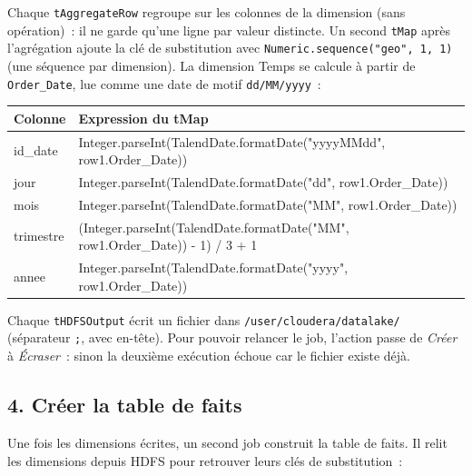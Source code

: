 \noindent Chaque \texttt{tAggregateRow} regroupe sur les colonnes de la dimension (sans opération)~: il ne garde qu'une ligne par valeur distincte. Un second \texttt{tMap} après l'agrégation ajoute la clé de substitution avec \texttt{Numeric.sequence("geo", 1, 1)} (une séquence par dimension). La dimension Temps se calcule à partir de \texttt{Order\_Date}, lue comme une date de motif \texttt{dd/MM/yyyy}~:

\begin{center}
\small
\begin{tabularx}{\textwidth}{>{\ttfamily}l >{\ttfamily\raggedright\arraybackslash}X}
\toprule
\normalfont\textbf{Colonne} & \normalfont\textbf{Expression du tMap} \\
\midrule
id\_date & Integer.parseInt(TalendDate.formatDate("yyyyMMdd", row1.Order\_Date)) \\
jour & Integer.parseInt(TalendDate.formatDate("dd", row1.Order\_Date)) \\
mois & Integer.parseInt(TalendDate.formatDate("MM", row1.Order\_Date)) \\
trimestre & (Integer.parseInt(TalendDate.formatDate("MM", row1.Order\_Date)) - 1) / 3 + 1 \\
annee & Integer.parseInt(TalendDate.formatDate("yyyy", row1.Order\_Date)) \\
\bottomrule
\end{tabularx}
\end{center}

\noindent Chaque \texttt{tHDFSOutput} écrit un fichier dans \texttt{/user/cloudera/datalake/} (séparateur \texttt{;}, avec en-tête). Pour pouvoir relancer le job, l'action passe de \textit{Créer} à \textit{Écraser}~: sinon la deuxième exécution échoue car le fichier existe déjà.

\subsection*{4. Créer la table de faits}
{}

\noindent Une fois les dimensions écrites, un second job construit la table de faits. Il relit les dimensions depuis HDFS pour retrouver leurs clés de substitution~:

